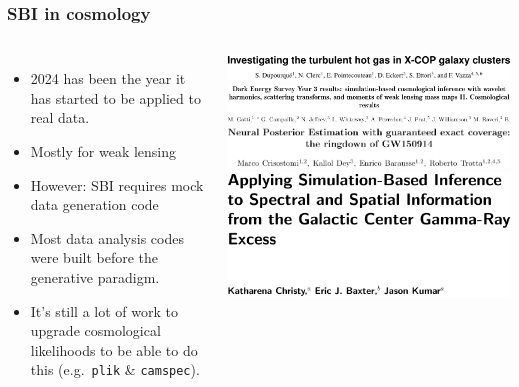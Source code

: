 \documentclass[aspectratio=169]{beamer}
\begin{document}
\begin{frame}
    \frametitle{SBI in cosmology}
    \begin{columns}
        \begin{itemize}
            \item 2024 has been the year it has started to be applied to real data.
            \item Mostly for weak lensing
            \item However: SBI requires mock data generation code
            \item Most data analysis codes were built before the generative paradigm.
            \item It's still a lot of work to upgrade cosmological likelihoods  to be able to do this (e.g.\ \texttt{plik} \& \texttt{camspec}).
        \end{itemize}
        \includegraphics[width=\textwidth]{figures/sbi_papers/clusters.pdf}
        \vspace{10pt}\\
        \includegraphics[width=\textwidth]{figures/sbi_papers/des.pdf}
        \vspace{10pt}\\
        \includegraphics[width=\textwidth]{figures/sbi_papers/gw.pdf}
        \vspace{10pt}\\
        \includegraphics[width=\textwidth]{figures/sbi_papers/center.pdf}

\end{columns}
\end{frame}
\end{document}
